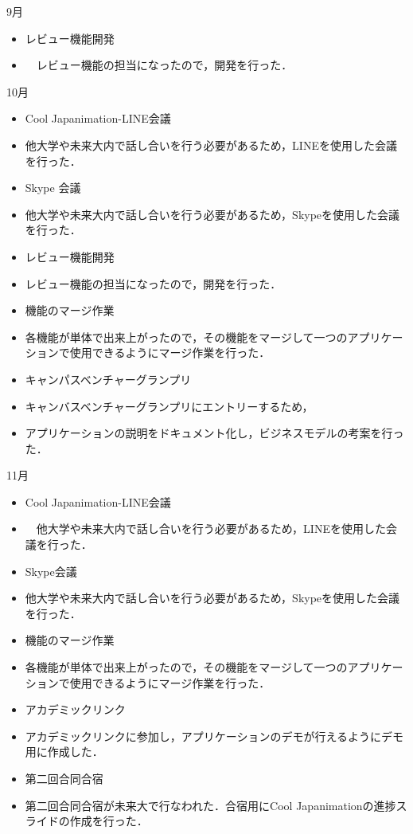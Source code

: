 9月
\begin{itemize}
\item レビュー機能開発
\item 　レビュー機能の担当になったので，開発を行った．
\end{itemize}
10月
\begin{itemize}
\item Cool Japanimation-LINE会議
\item   他大学や未来大内で話し合いを行う必要があるため，LINEを使用した会議を行った．
\item Skype 会議
\item 他大学や未来大内で話し合いを行う必要があるため，Skypeを使用した会議を行った．
\item レビュー機能開発
\item   レビュー機能の担当になったので，開発を行った．
\item 機能のマージ作業
\item   各機能が単体で出来上がったので，その機能をマージして一つのアプリケーションで使用できるようにマージ作業を行った．
\item キャンパスベンチャーグランプリ
\item   キャンバスベンチャーグランプリにエントリーするため，
\item   アプリケーションの説明をドキュメント化し，ビジネスモデルの考案を行った．
\end{itemize}
11月
\begin{itemize}
\item Cool Japanimation-LINE会議
\item 　他大学や未来大内で話し合いを行う必要があるため，LINEを使用した会議を行った．
\item Skype会議
\item   他大学や未来大内で話し合いを行う必要があるため，Skypeを使用した会議を行った．
\item 機能のマージ作業
\item   各機能が単体で出来上がったので，その機能をマージして一つのアプリケーションで使用できるようにマージ作業を行った．
\item アカデミックリンク
\item   アカデミックリンクに参加し，アプリケーションのデモが行えるようにデモ用に作成した．
\item 第二回合同合宿
\item   第二回合同合宿が未来大で行なわれた．合宿用にCool Japanimationの進捗スライドの作成を行った．
\end{itemize}

